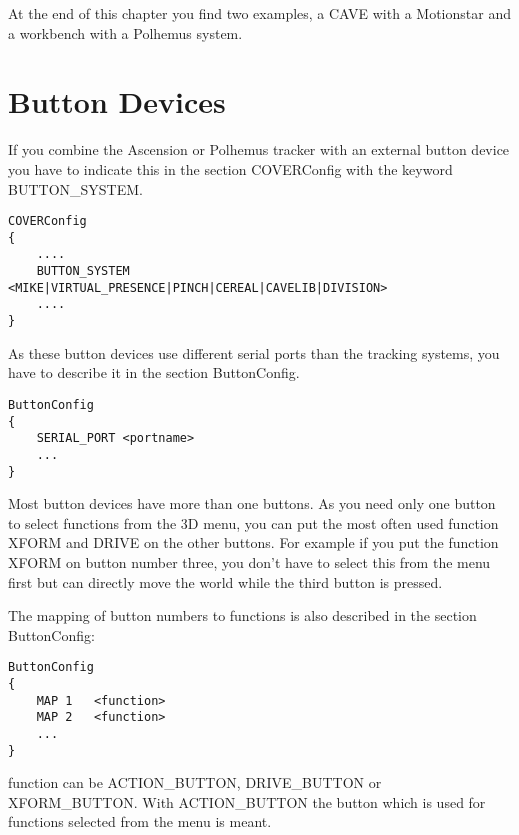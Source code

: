 At the end of this chapter you find two examples, a CAVE with a Motionstar
and a workbench with a Polhemus system.
\clearpage


\section{Button Devices}

If you combine the Ascension or Polhemus tracker with an external button device
you have to indicate this in the section COVERConfig with the keyword BUTTON\_SYSTEM.

\begin{samepage}
\small \begin{verbatim}
COVERConfig
{
    ....
    BUTTON_SYSTEM  <MIKE|VIRTUAL_PRESENCE|PINCH|CEREAL|CAVELIB|DIVISION>
    ....
}
\end{verbatim} \normalsize
\end{samepage}

As these button devices use different serial ports than the tracking systems,
you have to describe it in the section ButtonConfig.

\begin{samepage}
\small \begin{verbatim}
ButtonConfig
{
    SERIAL_PORT <portname>
    ...
}
\end{verbatim} \normalsize
\end{samepage}

Most button devices have more than one buttons. 
As you need only one button to select functions from the 3D menu,
you can put the most often used function XFORM and DRIVE on the other buttons.
For example if you put the function XFORM on button number three, you don't have
to select this from the menu first but can directly move the world while the
third button is pressed.

The mapping of button numbers to functions is also described in the section
ButtonConfig:

\begin{samepage}
\small \begin{verbatim}
ButtonConfig
{
    MAP 1   <function>
    MAP 2   <function>
    ...
}

\end{verbatim} \normalsize
\end{samepage}

function can be ACTION\_BUTTON, DRIVE\_BUTTON or XFORM\_BUTTON. With ACTION\_BUTTON
the button which is used for functions selected from the menu is meant.



